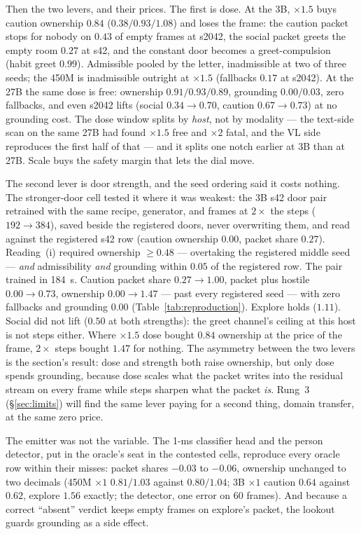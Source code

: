 \documentclass[11pt]{article}
\begin{document}
Then the two levers, and their prices. The first is dose. At the 3B,
$\times 1.5$ buys caution ownership $0.84$ ($0.38 / 0.93 / 1.08$) and
loses the frame: the caution packet stops for nobody on $0.43$ of empty
frames at s2042, the social packet greets the empty room $0.27$ at s42,
and the constant door becomes a greet-compulsion (habit greet $0.99$).
Admissible pooled by the letter, inadmissible at two of three seeds; the
450M is inadmissible outright at $\times 1.5$ (fallbacks $0.17$ at
s2042). At the 27B the same dose is free: ownership $0.91 / 0.93 / 0.89$,
grounding $0.00 / 0.03$, zero fallbacks, and even s2042 lifts (social
$0.34\to0.70$, caution $0.67\to0.73$) at no grounding cost. The dose
window splits by \emph{host}, not by modality --- the text-side scan on
the same 27B had found $\times 1.5$ free and $\times 2$ fatal, and the
VL side reproduces the first half of that --- and it splits one notch
earlier at 3B than at 27B. Scale buys the safety margin that lets the
dial move.

The second lever is door strength, and the seed ordering said it costs
nothing. The stronger-door cell tested it where it was weakest: the 3B
s42 door pair retrained with the same recipe, generator, and frames at
$2\times$ the steps ($192\to384$), saved beside the registered doors,
never overwriting them, and read against the registered s42 row
(caution ownership $0.00$, packet share $0.27$). Reading~(i) required
ownership $\ge 0.48$ --- overtaking the registered middle seed ---
\emph{and} admissibility \emph{and} grounding within $0.05$ of the
registered row. The pair trained in 184~s. Caution packet share
$0.27\to1.00$, packet plus hostile $0.00\to0.73$, ownership
$0.00\to1.47$ --- past every registered seed --- with zero fallbacks and
grounding $0.00$ (Table~\ref{tab:reproduction}). Explore holds ($1.11$).
Social did not lift ($0.50$ at both strengths): the greet channel's
ceiling at this host is not steps either. Where $\times 1.5$ dose bought
$0.84$ ownership at the price of the frame, $2\times$ steps bought
$1.47$ for nothing. The asymmetry between the two levers is the
section's result: dose and strength both raise ownership, but only
dose spends grounding, because dose scales what the packet writes into
the residual stream on every frame while steps sharpen what the packet
\emph{is}. Rung~3 (\S\ref{sec:limits}) will find the same lever paying
for a second thing, domain transfer, at the same zero price.

The emitter was not the variable. The 1-ms classifier head and the
person detector, put in the oracle's seat in the contested cells,
reproduce every oracle row within their misses: packet shares $-0.03$
to $-0.06$, ownership unchanged to two decimals (450M $\times1$
$0.81 / 1.03$ against $0.80 / 1.04$; 3B $\times1$ caution $0.64$ against
$0.62$, explore $1.56$ exactly; the detector, one error on 60 frames).
And because a correct ``absent'' verdict keeps empty frames on
explore's packet, the lookout guards grounding as a side effect.
\end{document}
